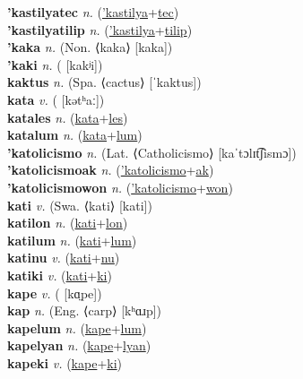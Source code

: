 \textbf{'kastilyatec} \textit{n.} (\hyperref['kastilya]{'kastilya}+\hyperref[tec]{tec})
 \label{'kastilyatec} \\
\textbf{'kastilyatilip} \textit{n.} (\hyperref['kastilya]{'kastilya}+\hyperref[tilip]{tilip})
 \label{'kastilyatilip} \\
\textbf{'kaka} \textit{n.} (Non. ⟨kaka⟩ [kaka])
 \label{'kaka} \\
\textbf{'kaki} \textit{n.} ( [kakʲi])
 \label{'kaki} \\
\textbf{kaktus} \textit{n.} (Spa. ⟨cactus⟩ [ˈkaktus])
 \label{kaktus} \\
\textbf{kata} \textit{v.} ( [kətʰaː])
 \label{kata} \\
\textbf{katales} \textit{n.} (\hyperref[kata]{kata}+\hyperref[les]{les})
 \label{katales} \\
\textbf{katalum} \textit{n.} (\hyperref[kata]{kata}+\hyperref[lum]{lum})
 \label{katalum} \\
\textbf{'katolicismo} \textit{n.} (Lat. ⟨Catholicismo⟩ [kaˈtɔlɪt͡ʃismɔ])
 \label{'katolicismo} \\
\textbf{'katolicismoak} \textit{n.} (\hyperref['katolicismo]{'katolicismo}+\hyperref[ak]{ak})
 \label{'katolicismoak} \\
\textbf{'katolicismowon} \textit{n.} (\hyperref['katolicismo]{'katolicismo}+\hyperref[won]{won})
 \label{'katolicismowon} \\
\textbf{kati} \textit{v.} (Swa. ⟨kati⟩ [kati])
 \label{kati} \\
\textbf{katilon} \textit{n.} (\hyperref[kati]{kati}+\hyperref[lon]{lon})
 \label{katilon} \\
\textbf{katilum} \textit{n.} (\hyperref[kati]{kati}+\hyperref[lum]{lum})
 \label{katilum} \\
\textbf{katinu} \textit{v.} (\hyperref[kati]{kati}+\hyperref[nu]{nu})
 \label{katinu} \\
\textbf{katiki} \textit{v.} (\hyperref[kati]{kati}+\hyperref[ki]{ki})
 \label{katiki} \\
\textbf{kape} \textit{v.} ( [kɑ̤pe])
 \label{kape} \\
\textbf{kap} \textit{n.} (Eng. ⟨carp⟩ [kʰɑɹp])
 \label{kap} \\
\textbf{kapelum} \textit{n.} (\hyperref[kape]{kape}+\hyperref[lum]{lum})
 \label{kapelum} \\
\textbf{kapelyan} \textit{n.} (\hyperref[kape]{kape}+\hyperref[lyan]{lyan})
 \label{kapelyan} \\
\textbf{kapeki} \textit{v.} (\hyperref[kape]{kape}+\hyperref[ki]{ki})
